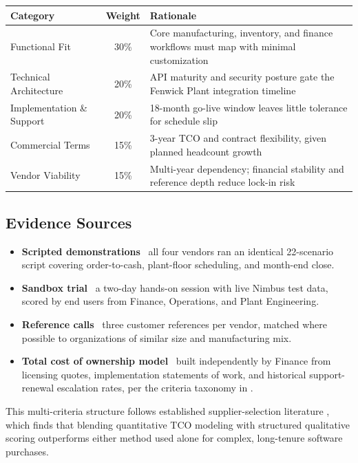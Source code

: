 \begin{center}
\begin{tabularx}{0.92\linewidth}{X c X}
\toprule
\textbf{Category} & \textbf{Weight} & \textbf{Rationale} \\
\midrule
Functional Fit & 30\% & Core manufacturing, inventory, and finance workflows must map with minimal customization \\
Technical Architecture & 20\% & API maturity and security posture gate the Fenwick Plant integration timeline \\
Implementation \& Support & 20\% & 18-month go-live window leaves little tolerance for schedule slip \\
Commercial Terms & 15\% & 3-year TCO and contract flexibility, given planned headcount growth \\
Vendor Viability & 15\% & Multi-year dependency; financial stability and reference depth reduce lock-in risk \\
\bottomrule
\end{tabularx}
\end{center}

\subsection{Evidence Sources}

\begin{itemize}[leftmargin=1.4em, itemsep=2pt]
  \item \textbf{Scripted demonstrations} \textemdash\ all four vendors ran an identical 22-scenario
    script covering order-to-cash, plant-floor scheduling, and month-end close.
  \item \textbf{Sandbox trial} \textemdash\ a two-day hands-on session with live Nimbus test data,
    scored by end users from Finance, Operations, and Plant Engineering.
  \item \textbf{Reference calls} \textemdash\ three customer references per vendor, matched where
    possible to organizations of similar size and manufacturing mix.
  \item \textbf{Total cost of ownership model} \textemdash\ built independently by Finance from
    licensing quotes, implementation statements of work, and historical support-renewal
    escalation rates, per the criteria taxonomy in \citet{weber1991}.
\end{itemize}

This multi-criteria structure follows established supplier-selection literature
\citep{ho2010,chai2013}, which finds that blending quantitative TCO modeling with structured
qualitative scoring outperforms either method used alone for complex, long-tenure software
purchases.
